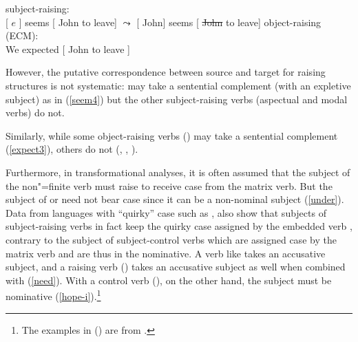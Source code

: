 \eal
\ex subject-raising:\\
{}[ $e$ ] seems [ John to leave] 
$\leadsto$  
{}[ John] seems [ \st{John} to leave]
\ex object-raising (ECM):\\
We expected [ John to leave ] 	
\zl

\noindent
However, the putative correspondence between source and target for raising structures is not
systematic:  may take a sentential complement (with an expletive subject) as in
(\ref{seem4}) but the other subject-raising verbs (aspectual and modal verbs) do not.

\eal
{}
\zl
 
 \noindent
 Similarly, while some object-raising verbs () may take a sentential complement (\ref{expect3}), others do not (, , ).
 
\eal
{}
\zl

Furthermore, in transformational analyses, it is often assumed that the subject of the non"=finite verb must raise to receive case from the matrix verb.
 But the subject of  or  need not bear case  since it can be a non-nominal subject (\ref{under}).
Data from languages with ``quirky'' case such as , also show that subjects of
subject-raising verbs in fact keep the quirky case assigned by the embedded verb
\citep{Zaenenetal1985}\addpages, contrary to the subject of subject-control verbs which are assigned
case by the matrix verb and are thus in the nominative. A verb like  takes an accusative
subject, and a raising verb () takes an accusative subject as well when combined with
 (\ref{need}). With a control verb (), on the other hand, the subject must be
nominative (\ref{hope-i}).\footnote{
The examples in () are from  .
}


